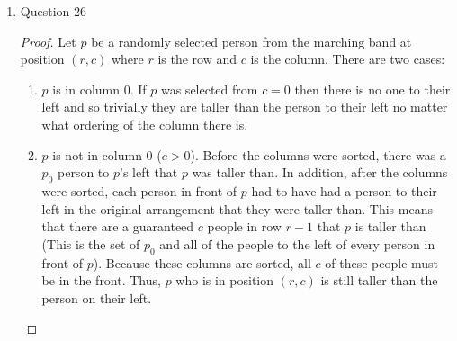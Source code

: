 \documentclass[12pt]{exam}
\begin{document}
\begin{enumerate}
\begin{proof}
\begin{enumerate}
    This means there are 98 people who share either $2, 4, \dots, 96$ acquaintances. It is impossible for anyone to know 98 acquaintances because there are 2 people who already don't know anyone. This means there are 48 possible numbers of acquaintances for any person to know. Construct an algorithm to put 2 people into each "bucket" of number of acquaintances that they know. All of the buckets would be filled after 96 people. By the pigeonhole principle, there must be a three people who know the same number of acquaintances. 
    
    \item Case 3: There is only one person who has no acquaintances. 
    
    This means that there are 99 people who share either $2, 4, \dots, 98$ acquaintances. Clearly, there are 49 different numbers of acquaintances that a person could have. Given that $49 \cdot  2$ people ($98$ people) can be places into individual buckets such that there are not three people with the same number of acquaintances, then by the pigeonhole principle, there must be three people who share the same number of acquaintances. 
    
    In all three cases, there must be three people who share the same number of acquaintances. 
    
\end{enumerate}
\end{proof}

\item Question 26

\begin{proof}
Let $p$ be a randomly selected person from the marching band at position $(r, c)$ where $r$ is the row and $c$ is the column. There are two cases:

\begin{enumerate}
    \item $p$ is in column 0. If $p$ was selected from $c = 0$ then there is no one to their left and so trivially they are taller than the person to their left no matter what ordering of the column there is.
    
    \item $p$ is not in column 0 ($c > 0$). Before the columns were sorted, there was a $p_0$ person to $p$'s left that $p$ was taller than. In addition, after the columns were sorted, each person in front of $p$ had to have had a person to their left in the original arrangement that they were taller than. This means that there are a guaranteed $c$ people in row $r - 1$ that $p$ is taller than (This is the set of $p_0$ and all of the people to the left of every person in front of $p$). Because these columns are sorted, all $c$ of these people must be in the front. Thus, $p$ who is in position $(r, c)$ is still taller than the person on their left.
\end{enumerate}


\end{proof}

\end{enumerate}
\end{document}
